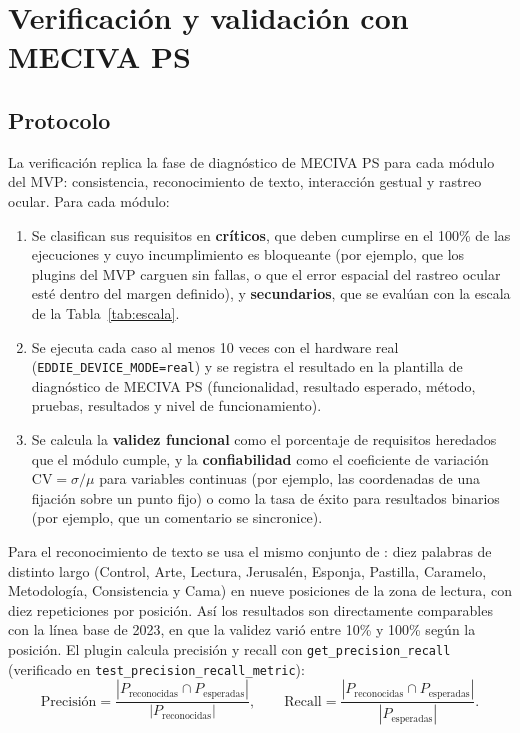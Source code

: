 \section{Verificación y validación con MECIVA PS}

\subsection{Protocolo}

La verificación replica la fase de diagnóstico de MECIVA PS \citep{ibaceta2023evaluacion} para cada módulo del MVP: consistencia, reconocimiento de texto, interacción gestual y rastreo ocular. Para cada módulo:

\begin{enumerate}
  \item Se clasifican sus requisitos en \textbf{críticos}, que deben cumplirse en el 100\% de las ejecuciones y cuyo incumplimiento es bloqueante (por ejemplo, que los plugins del MVP carguen sin fallas, o que el error espacial del rastreo ocular esté dentro del margen definido), y \textbf{secundarios}, que se evalúan con la escala de la Tabla~\ref{tab:escala}.
  \item Se ejecuta cada caso al menos 10 veces con el hardware real (\texttt{EDDIE\_DEVICE\_MODE=real}) y se registra el resultado en la plantilla de diagnóstico de MECIVA PS (funcionalidad, resultado esperado, método, pruebas, resultados y nivel de funcionamiento).
  \item Se calcula la \textbf{validez funcional} como el porcentaje de requisitos heredados que el módulo cumple, y la \textbf{confiabilidad} como el coeficiente de variación $\mathrm{CV}=\sigma/\mu$ para variables continuas (por ejemplo, las coordenadas de una fijación sobre un punto fijo) o como la tasa de éxito para resultados binarios (por ejemplo, que un comentario se sincronice).
\end{enumerate}

Para el reconocimiento de texto se usa el mismo conjunto de \citet{ibaceta2023evaluacion}: diez palabras de distinto largo (Control, Arte, Lectura, Jerusalén, Esponja, Pastilla, Caramelo, Metodología, Consistencia y Cama) en nueve posiciones de la zona de lectura, con diez repeticiones por posición. Así los resultados son directamente comparables con la línea base de 2023, en que la validez varió entre 10\% y 100\% según la posición. El plugin calcula precisión y recall con \texttt{get\_precision\_recall} (verificado en \texttt{test\_precision\_recall\_metric}):
\begin{equation}
\mathrm{Precisión}=\frac{|P_{\text{reconocidas}}\cap P_{\text{esperadas}}|}{|P_{\text{reconocidas}}|},\qquad
\mathrm{Recall}=\frac{|P_{\text{reconocidas}}\cap P_{\text{esperadas}}|}{|P_{\text{esperadas}}|}.
\end{equation}

